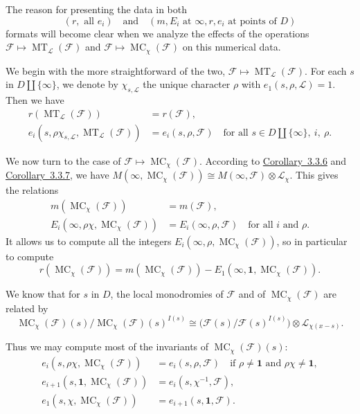 The reason for presenting the data in both
\[
(r,\text{ all }e_i)\quad\text{and}\quad(m,E_i\text{ at }\infty,r,e_i\text{ at points of }D)
\]
formats will become clear when we analyze the effects of the operations \(\mathcal{F}\mapsto \operatorname{MT}_{\mathcal{L}}(\mathcal{F})\) and \(\mathcal{F}\mapsto \operatorname{MC}_\chi(\mathcal{F})\) on this numerical data.

We begin with the more straightforward of the two, \(\mathcal{F}\mapsto \operatorname{MT}_{\mathcal{L}}(\mathcal{F})\). For each \(s\) in \(D\amalg\{\infty\}\), we denote by \(\chi_{s,\mathcal{L}}\) the unique character \(\rho\) with \(e_1(s,\rho,\mathcal{L})=1\). Then we have
\[
\begin{aligned}
r(\operatorname{MT}_{\mathcal{L}}(\mathcal{F}))&=r(\mathcal{F}),\\
e_i(s,\rho\chi_{s,\mathcal{L}},\operatorname{MT}_{\mathcal{L}}(\mathcal{F}))&=e_i(s,\rho,\mathcal{F})\quad\text{for all }s\in D\amalg\{\infty\},\ i,\ \rho.
\end{aligned}
\]

We now turn to the case of \(\mathcal{F}\mapsto \operatorname{MC}_\chi(\mathcal{F})\). According to \hyperref[cor:3.3.6]{Corollary~3.3.6} and \hyperref[cor:3.3.7]{Corollary~3.3.7}, we have \(M(\infty,\operatorname{MC}_\chi(\mathcal{F}))\cong M(\infty,\mathcal{F})\otimes\mathcal{L}_\chi\). This gives the relations
\[
\begin{aligned}
m(\operatorname{MC}_\chi(\mathcal{F}))&=m(\mathcal{F}),\\
E_i(\infty,\rho\chi,\operatorname{MC}_\chi(\mathcal{F}))&=E_i(\infty,\rho,\mathcal{F})\quad\text{for all }i\text{ and }\rho.
\end{aligned}
\]
It allows us to compute all the integers \(E_i(\infty,\rho,\operatorname{MC}_\chi(\mathcal{F}))\), so in particular to compute
\[
r(\operatorname{MC}_\chi(\mathcal{F}))=m(\operatorname{MC}_\chi(\mathcal{F}))-E_1(\infty,\mathbf{1},\operatorname{MC}_\chi(\mathcal{F})).
\]

We know that for \(s\) in \(D\), the local monodromies of \(\mathcal{F}\) and of \(\operatorname{MC}_\chi(\mathcal{F})\) are related by
\[
\operatorname{MC}_\chi(\mathcal{F})(s)/\operatorname{MC}_\chi(\mathcal{F})(s)^{I(s)}
\cong \bigl(\mathcal{F}(s)/\mathcal{F}(s)^{I(s)}\bigr)\otimes\mathcal{L}_{\chi(x-s)}.
\]

Thus we may compute most of the invariants of \(\operatorname{MC}_\chi(\mathcal{F})(s)\):
\[
\begin{aligned}
e_i(s,\rho\chi,\operatorname{MC}_\chi(\mathcal{F}))&=e_i(s,\rho,\mathcal{F})\quad\text{if }\rho\ne\mathbf{1}\text{ and }\rho\chi\ne\mathbf{1},\\
e_{i+1}(s,\mathbf{1},\operatorname{MC}_\chi(\mathcal{F}))&=e_i(s,\chi^{-1},\mathcal{F}),\\
e_1(s,\chi,\operatorname{MC}_\chi(\mathcal{F}))&=e_{i+1}(s,\mathbf{1},\mathcal{F}).
\end{aligned}
\]

